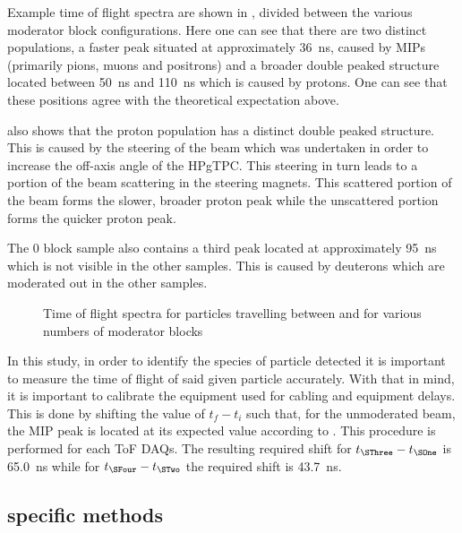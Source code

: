 Example time of flight spectra are shown in , divided between the various moderator block configurations.
Here one can see that there are two distinct populations, a faster peak situated at approximately \SI{36}{\nano\second}, caused by MIPs (primarily pions, muons and positrons) and a broader double peaked structure located between \SI{50}{\nano\second} and \SI{110}{\nano\second} which is caused by protons.
One can see that these positions agree with the theoretical expectation above.

 also shows that the proton population has a distinct double peaked structure.
This is caused by the steering of the beam which was undertaken in order to increase the off-axis angle of the HPgTPC.
This steering in turn leads to a portion of the beam scattering in the steering magnets.
This scattered portion of the beam forms the slower, broader proton peak while the unscattered portion forms the quicker proton peak.

The 0 block sample also contains a third peak located at approximately \SI{95}{\nano\second} which is not visible in the other samples.
This is caused by deuterons which are moderated out in the other samples.

\begin{figure}[h]
  \begin{adjustbox}{max totalsize={.8\linewidth}, center}
    
  \end{adjustbox}
  \caption[Time of flight spectra for particles travelling between \SOne and \SThree for various numbers of moderator blocks]{Time of flight spectra for particles travelling between \SOne and \SThree for various numbers of moderator blocks}
  \label{fig:s3Tof}
\end{figure}

In this study, in order to identify the species of particle detected it is important to measure the time of flight of said given particle accurately.
With that in mind, it is important to calibrate the equipment used for cabling and equipment delays.
This is done by shifting the value of $t_{f}-t_{i}$ such that, for the unmoderated beam, the MIP peak is located at its expected value according to .
This procedure is performed for each ToF DAQs.
The resulting required shift for $t_{\SThree} - t_{\SOne}$ is \SI{65.0}{\nano\second} while for $t_{\SFour} - t_{\STwo}$ the required shift is \SI{43.7}{\nano\second}.

\subsection{\SThree specific methods}
\label{sec:hptpc_beam_flux:methods:s3}


